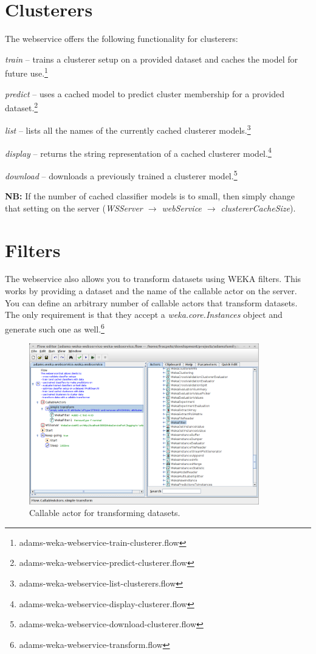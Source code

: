 \documentclass[a4paper]{book}
\begin{document}
\section{Clusterers}
The webservice offers the following functionality for clusterers:
\begin{tight_itemize}
	\item \textit{train} -- trains a clusterer setup on a provided dataset 
	and caches the model for future use.\footnote{adams-weka-webservice-train-clusterer.flow}
	\item \textit{predict} -- uses a cached model to predict cluster membership
	for	a provided dataset.\footnote{adams-weka-webservice-predict-clusterer.flow}
	\item \textit{list} -- lists all the names of the currently cached clusterer
	models.\footnote{adams-weka-webservice-list-clusterers.flow}
	\item \textit{display} -- returns the string representation of a cached
	clusterer model.\footnote{adams-weka-webservice-display-clusterer.flow}
	\item \textit{download} -- downloads a previously trained a clusterer 
	model.\footnote{adams-weka-webservice-download-clusterer.flow}
\end{tight_itemize}
\textbf{NB:} If the number of cached classifier models is to small, then simply 
change that setting on the server 
(\textit{WSServer $\rightarrow$ webService $\rightarrow$ clustererCacheSize}).

\section{Filters}
The webservice also allows you to transform datasets using WEKA filters. This
works by providing a dataset and the name of the callable actor on the server.
You can define an arbitrary number of callable actors that transform datasets.
The only requirement is that they accept a \textit{weka.core.Instances} object
and generate such one as well.\footnote{adams-weka-webservice-transform.flow}

\begin{figure}[htb]
  \centering
  \includegraphics[width=10.0cm]{images/transform_callable_actor.png}
  \caption{Callable actor for transforming datasets.}
  \label{transform_callable_actor}
\end{figure}
\end{document}
